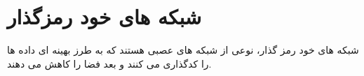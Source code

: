 \section{شبکه های خود رمزگذار}

شبکه های خود رمز گذار، نوعی از شبکه های عصبی هستند که به طرز بهینه ای داده ها را کدگذاری می کنند و بعد فضا را کاهش می دهند.
